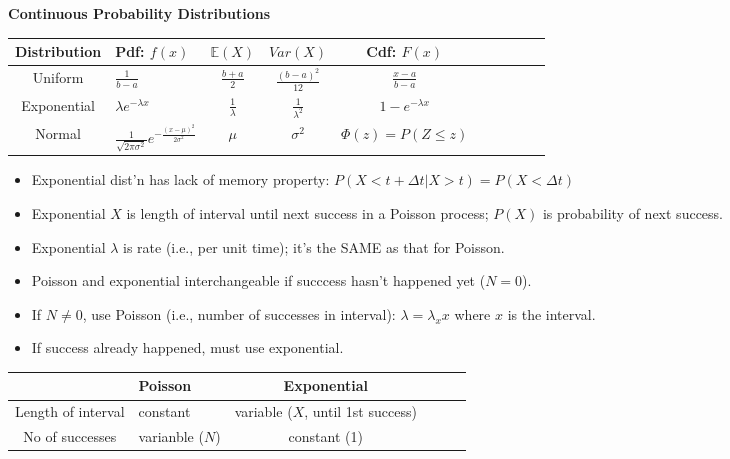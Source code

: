 \documentclass[twocolumn]{article}
\begin{document}
\clearpage


\textbf{Continuous Probability Distributions}

\begin{table}[ht]
    \centering
    \begin{tabular}{Sl Sc Sc Sc Sc}
        \toprule \toprule
        Distribution & Pdf: $f(x)$ & $\mathbb{E}(X)$ & $Var(X)$ & Cdf: $F(x)$ \\
        \toprule \toprule
        Uniform & $\frac{1}{b-a}$ & $\frac{b+a}{2}$ & $\frac{(b-a)^2}{12}$ & $\frac{x-a}{b-a}$ \\
        \midrule
        Exponential & $\lambda e^{-\lambda x}$ & $\frac{1}{\lambda}$ & $\frac{1}{\lambda^2}$ & $1-e^{-\lambda x}$ \\
        \midrule
        Normal & $\frac{1}{\sqrt{2 \pi \sigma^2}} e^{-\frac{(x-\mu)^2}{2\sigma^2}}$ & $\mu$ & $\sigma^2$ & $\Phi(z) = P(Z \leq z)$ \\
        \bottomrule \bottomrule
    \end{tabular}
\end{table} \vspace{-.5em}

\vspace{-.5em}
\begin{itemize}
    \item Exponential dist'n has lack of memory property: $P(X < t + \Delta t | X > t) = P(X < \Delta t)$
    \item Exponential $X$ is length of interval until next success in a Poisson process; $P(X)$ is probability of next success.
    \item Exponential $\lambda$ is rate (i.e., per unit time); it's the SAME as that for Poisson.
    \item Poisson and exponential interchangeable if succcess hasn't happened yet ($N=0$).
    \item If $N \neq 0$, use Poisson (i.e., number of successes in interval): $\lambda = \lambda_x x$ where $x$ is the interval.
    \item If success already happened, must use exponential.
\end{itemize} \vspace{-.5em}

\begin{table}[ht]
    \centering
    \begin{tabular}{Sl | Sc Sc}
        \hline
        & Poisson & Exponential \\
        \hline
        Length of interval & constant & variable ($X$, until 1st success) \\
        No of successes & varianble ($N$) & constant (1) \\
        \hline
    \end{tabular}
\end{table}
\end{document}
